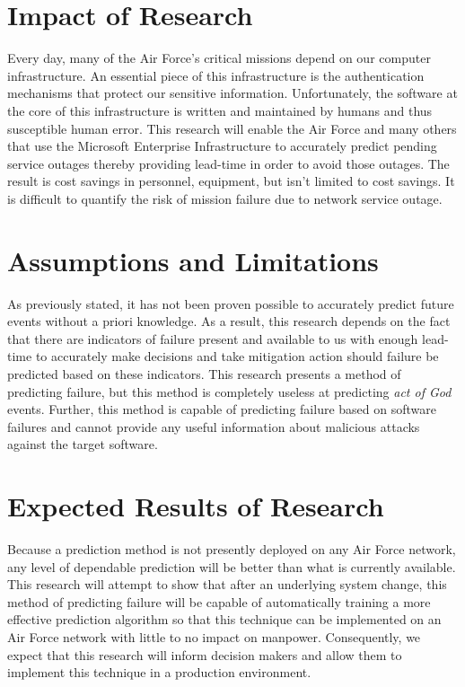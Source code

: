 \section{Impact of Research}
Every day, many of the Air Force's critical missions depend on our computer
infrastructure.  An essential piece of this infrastructure is the
authentication mechanisms that protect our sensitive information.
Unfortunately, the software at the core of this infrastructure is written and
maintained by humans and thus susceptible human error.  This research will
enable the Air Force and many others that use the Microsoft Enterprise
Infrastructure to accurately predict pending service outages thereby providing
lead-time in order to avoid those outages.  The result is cost savings in
personnel, equipment, but isn't limited to cost savings.  It is difficult to
quantify the risk of mission failure due to network service outage.

\section{Assumptions and Limitations}
As previously stated, it has not been proven possible to accurately predict
future events without a priori knowledge.  As a result, this research depends
on the fact that there are indicators of failure present and available to us
with enough lead-time to accurately make decisions and take mitigation action
should failure be predicted based on these indicators.  This research presents
a method of predicting failure, but this method is completely useless at
predicting \emph{act of God} events.  Further, this method is capable of
predicting failure based on software failures and cannot provide any useful
information about malicious attacks against the target software.

\section{Expected Results of Research}
Because a prediction method is not presently deployed on any Air Force network,
any level of dependable prediction will be better than what is currently
available.  This research will attempt to show that after an underlying system
change, this method of predicting failure will be capable of automatically
training a more effective prediction algorithm so that this technique can be
implemented on an Air Force network with little to no impact on manpower.
Consequently, we expect that this research will inform decision makers and
allow them to implement this technique in a production environment.

